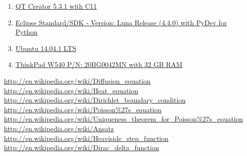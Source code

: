 \documentclass[11pt,english,a4paper]{article}
\begin{document}
\begin{flushleft}
\begin{enumerate}
\item{\href{http://qt-project.org/downloads}{QT Creator 5.3.1 with C11}}
\item{\href{https://www.eclipse.org/downloads/}{Eclipse Standard/SDK  - Version: Luna Release (4.4.0) with PyDev for Python}}
\item{\href{http://www.ubuntu.com/download/desktop}{Ubuntu 14.04.1 LTS}}
\item{\href{http://shop.lenovo.com/no/en/laptops/thinkpad/w-series/w540/#tab-reseller}{ThinkPad W540 P/N: 20BG0042MN with 32 GB RAM}}
\end{enumerate}

\begin{thebibliography}{1}
\href{http://en.wikipedia.org/wiki/Diffusion\_equation}{http://en.wikipedia.org/wiki/Diffusion\_equation}
\href{http://en.wikipedia.org/wiki/Heat\_equation}{http://en.wikipedia.org/wiki/Heat\_equation}
\href{http://en.wikipedia.org/wiki/Dirichlet\_boundary\_condition}{http://en.wikipedia.org/wiki/Dirichlet\_boundary\_condition}
\href{http://en.wikipedia.org/wiki/Poisson\%27s\_equation}{http://en.wikipedia.org/wiki/Poisson\%27s\_equation}
\href{http://en.wikipedia.org/wiki/Uniqueness\_theorem\_for\_Poisson\%27s\_equation}{http://en.wikipedia.org/wiki/Uniqueness\_theorem\_for\_Poisson\%27s\_equation}
\href{http://en.wikipedia.org/wiki/Ansatz}{http://en.wikipedia.org/wiki/Ansatz}
\href{http://en.wikipedia.org/wiki/Heaviside\_step\_function}{http://en.wikipedia.org/wiki/Heaviside\_step\_function}
\href{http://en.wikipedia.org/wiki/Dirac\_delta\_function}{http://en.wikipedia.org/wiki/Dirac\_delta\_function}
\end{thebibliography}

\end{flushleft}
\end{document}
